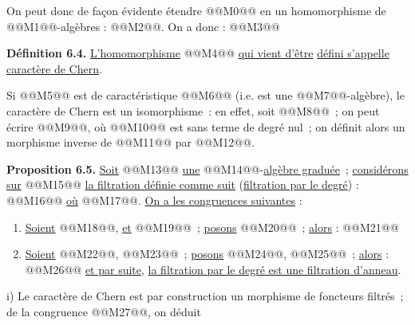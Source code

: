 

On
peut donc de façon évidente étendre @@M0@@ en un homomorphisme de @@M1@@-algèbres : @@M2@@. On a donc :
@@M3@@

\textbf{Définition 6.4.} \uline{L'homomorphisme} @@M4@@ \uline{qui vient d'être} \uline{défini s'appelle caractère de Chern}.

Si @@M5@@ est de caractéristique @@M6@@ (i.e. est une @@M7@@-algèbre), le caractère de Chern est un isomorphisme~: en effet, soit @@M8@@~; on peut écrire @@M9@@, où @@M10@@ est sans terme de degré nul~; on définit alors un morphisme inverse de @@M11@@ par @@M12@@.

\textbf{Proposition 6.5.} \uline{Soit} @@M13@@ \uline{une} @@M14@@-\uline{algèbre graduée}~; \uline{considérons sur} @@M15@@ \uline{la filtration définie comme suit} (\uline{filtration par le degré}) :
@@M16@@
\uline{où} @@M17@@. \uline{On a les congruences suivantes} :

\begin{enumerate}[label=\roman*)]
\item \uline{Soient} @@M18@@, \uline{et} @@M19@@~; \uline{posons} @@M20@@~; \uline{alors} :
@@M21@@

\item \uline{Soient} @@M22@@, @@M23@@~; \uline{posons}
@@M24@@, @@M25@@~; \uline{alors} :
@@M26@@
\uline{et par suite}, \uline{la filtration par le degré est une filtration d'anneau}.
\end{enumerate}

i) Le caractère de Chern est par construction un morphisme de foncteurs filtrés~; de la congruence @@M27@@, on déduit
